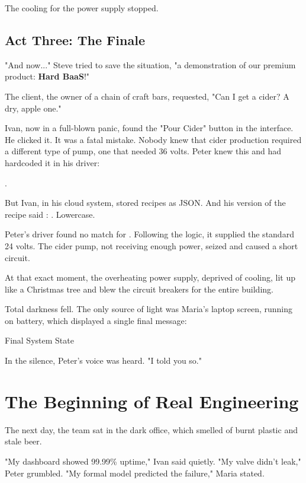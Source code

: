 The cooling for the power supply stopped.

\subsection*{Act Three: The Finale}

"And now..." Steve tried to save the situation, "a demonstration of our premium product: \textbf{Hard BaaS}!"

The client, the owner of a chain of craft bars, requested, "Can I get a cider? A dry, apple one."

Ivan, now in a full-blown panic, found the "Pour Cider" button in the interface. He clicked it. It was a fatal mistake. Nobody knew that cider production required a different type of pump, one that needed 36 volts. Peter knew this and had hardcoded it in his driver: 

.

But Ivan, in his cloud system, stored recipes as JSON. And his version of the recipe said : . Lowercase.

Peter's driver found no match for . Following the  logic, it supplied the standard 24 volts. The cider pump, not receiving enough power, seized and caused a short circuit.

At that exact moment, the overheating power supply, deprived of cooling, lit up like a Christmas tree and blew the circuit breakers for the entire building.

Total darkness fell. The only source of light was Maria's laptop screen, running on battery, which displayed a single final message:

\begin{infobox}{Final System State}
\end{infobox}

In the silence, Peter's voice was heard. "I told you so."

\section{The Beginning of Real Engineering}

The next day, the team sat in the dark office, which smelled of burnt plastic and stale beer.

"My dashboard showed 99.99\% uptime," Ivan said quietly.
"My valve didn't leak," Peter grumbled.
"My formal model predicted the failure," Maria stated.


